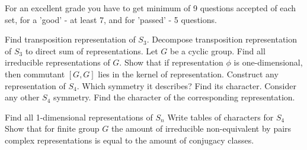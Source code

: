 \documentclass[12pt]{article}
\begin{document}
	
	For an excellent grade you have to get minimum of 9 questions accepted  of each set, for a 'good' - at least 7, and for 'passed' - 5 questions.	
	

	\p
	Find transposition representation of $S_3$.
	\ep
	\p
	Decompose transposition representation of $S_3$ to direct sum of representations.
	\ep
	\p 
	Let $G$ be a cyclic group. Find all irreducible representations of $G$.
	\ep
	\p 
   Show that if  representation $\phi$ is one-dimensional, then commutant $[G,G]$ lies in the kernel of representation.
	\ep
	\p
	Construct any representation of $S_4$. Which symmetry it describes? Find its character.
	\ep
	\p Consider any other $S_4$ symmetry. Find the character of the corresponding representation.
	\ep

	
	\p Find all 1-dimensional representations of $S_n$
	\ep
	\p Write tables of characters for $S_4$
	\ep
	\p Show that for finite group $G$ the amount of irreducible  non-equivalent by pairs complex representations is equal to the amount of conjugacy classes.	
	\ep


	
\end{document}

